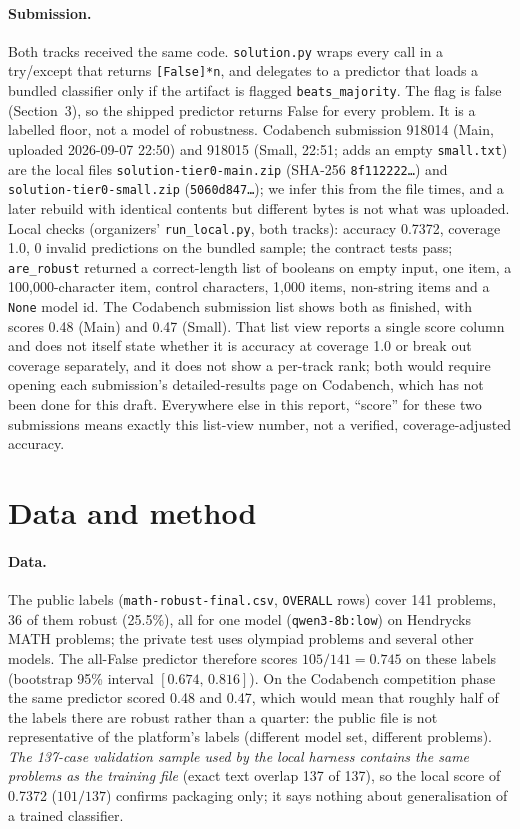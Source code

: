 \documentclass{article}
\begin{document}
\paragraph{Submission.} Both tracks received the same code. \texttt{solution.py} wraps every call in a try/except that returns \texttt{[False]*n}, and delegates to a predictor that loads a bundled classifier only if the artifact is flagged \texttt{beats\_majority}.
The flag is false (Section~3), so the shipped predictor returns False for every problem. It is a labelled floor, not a model of robustness.
Codabench submission 918014 (Main, uploaded 2026-09-07 22:50) and 918015 (Small, 22:51; adds an empty \texttt{small.txt}) are the local files \texttt{solution-tier0-main.zip} (SHA-256 \texttt{8f112222\dots}) and \texttt{solution-tier0-small.zip} (\texttt{5060d847\dots}); we infer this from the file times, and a later rebuild with identical contents but different bytes is not what was uploaded. Local checks (organizers' \texttt{run\_local.py}, both tracks): accuracy 0.7372, coverage 1.0, 0 invalid predictions on the bundled sample; the contract tests pass; \texttt{are\_robust} returned a correct-length list of booleans on empty input, one item, a 100,000-character item, control characters, 1,000 items, non-string items and a \texttt{None} model id.
The Codabench submission list shows both as finished, with scores 0.48 (Main) and 0.47 (Small). That list view reports a single score column and does not itself state whether it is accuracy at coverage 1.0 or break out coverage separately, and it does not show a per-track rank; both would require opening each submission's detailed-results page on Codabench, which has not been done for this draft. Everywhere else in this report, ``score'' for these two submissions means exactly this list-view number, not a verified, coverage-adjusted accuracy.

\section{Data and method}
\paragraph{Data.} The public labels (\texttt{math-robust-final.csv}, \texttt{OVERALL} rows) cover 141 problems, 36 of them robust (25.5\%), all for one model (\texttt{qwen3-8b:low}) on Hendrycks MATH problems; the private test uses olympiad problems and several other models.
The all-False predictor therefore scores $105/141=0.745$ on these labels (bootstrap 95\% interval $[0.674,\,0.816]$).
On the Codabench competition phase the same predictor scored 0.48 and 0.47, which would mean that roughly half of the labels there are robust rather than a quarter: the public file is not representative of the platform's labels (different model set, different problems).
\emph{The 137-case validation sample used by the local harness contains the same problems as the training file} (exact text overlap 137 of 137), so the local score of 0.7372 ($101/137$) confirms packaging only; it says nothing about generalisation of a trained classifier.
\end{document}
